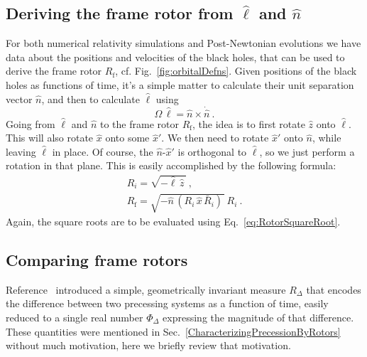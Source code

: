 \documentclass[aps,prd,amsmath,floatfix,twocolumn,superscriptaddress,nofootinbib,showpacs]{revtex4-1}
\newcommand{\ellHat}{\ensuremath{\hat{\ell}}}
\newcommand{\nHat}{\ensuremath{\hat{n}}}
\newcommand{\Rf}[1][]{\ensuremath{R_{\text{f#1}}}}
\begin{document}
\subsection{Deriving the frame rotor from
  \texorpdfstring{$\ellHat$}{ellHat} and
  \texorpdfstring{$\nHat$}{nHat}}
\label{sec:Derivingtheframerotorfromellhatandnhat}
For both numerical relativity simulations and Post-Newtonian
evolutions we have data about the positions and velocities of the
black holes, that can be used to derive the frame rotor $\Rf$,
cf. Fig.~\ref{fig:orbitalDefns}.  Given positions of the black holes
as functions of time, it's a simple matter to calculate their unit
separation vector $\nHat$, and then to calculate $\ellHat$ using
\begin{equation}
  \label{eq:ellHatFromnHat}
  \Omega\, \ellHat = \hat{n} \times \dot{\hat{n}}~.
\end{equation}
Going from $\ellHat$ and $\nHat$ to the frame rotor $\Rf$, the idea is
to first rotate $\hat{z}$ onto $\ellHat$.  This will also rotate
$\hat{x}$ onto some $\hat{x}'$.  We then need to rotate $\hat{x}'$
onto $\nHat$, while leaving $\ellHat$ in place.  Of course, the
$\nHat$-$\hat{x}'$ is orthogonal to $\ellHat$, so we just perform a
rotation in that plane.  This is easily accomplished by the following
formula:
\begin{subequations}
  \label{eq:FrameRotorFromBasisVectors}
  \begin{gather}
    R_{i} = \sqrt{-\ellHat\, \hat{z}\,}~, \\[0.5em]
    \Rf = \sqrt{-\nHat\, (R_{i}\, \hat{x}\, \bar{R}_{i})\,}\, R_{i}~.
  \end{gather}
\end{subequations}
Again, the square roots are to be evaluated using
Eq.~\eqref{eq:RotorSquareRoot}.



\subsection{Comparing frame rotors}
\label{sec:ComparingFrames}
Reference~\cite{Boyle:2013} introduced a simple, geometrically
invariant measure $R_{\Delta}$ that encodes the difference between two
precessing systems as a function of time, easily reduced to a single
real number $\Phi_{\Delta}$ expressing the magnitude of that
difference.  These quantities were mentioned in
Sec.~\ref{CharacterizingPrecessionByRotors} without much motivation,
here we briefly review that motivation.
\end{document}
